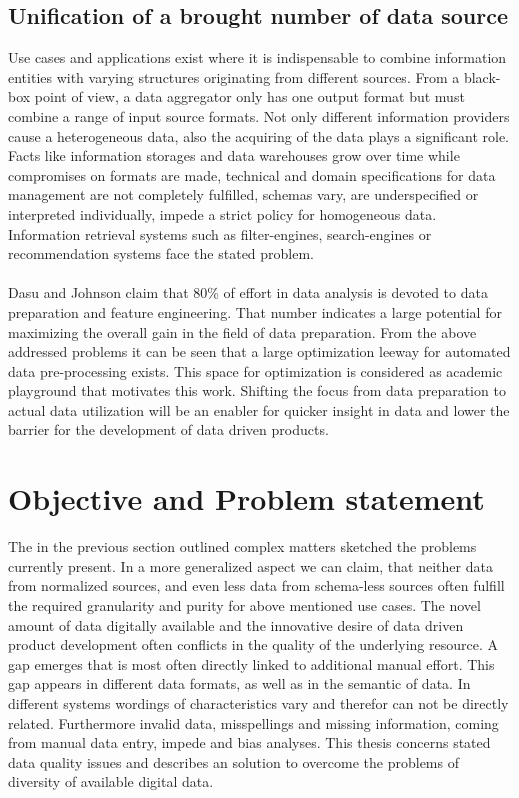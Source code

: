 \subsection{Unification of a brought number of data source} 

Use cases and applications exist where it is indispensable to combine information entities with varying structures originating from different sources. From a black-box point of view, a data aggregator only has one output format but must combine a range of input source formats. Not only different information providers cause a heterogeneous data, also the acquiring of the data plays a significant role. Facts like information storages and data warehouses grow over time while compromises on formats are made, technical and domain specifications for data management are not completely fulfilled, schemas vary, are underspecified or interpreted individually, impede a strict policy for homogeneous data. Information retrieval systems such as filter-engines, search-engines or recommendation systems face the stated problem. 
\\\\
Dasu and Johnson claim that 80\% of effort in data analysis is devoted to data preparation and feature engineering\cite{dasu_johnson_2003}. That number indicates a large potential for maximizing the overall gain in the field of data preparation. From the above addressed problems it can be seen that a large optimization leeway for automated data pre-processing exists. This space for optimization is considered as academic playground that motivates this work. Shifting the focus from data preparation to actual data utilization will be an enabler for quicker insight in data and lower the barrier for the development of data driven products.

\section{Objective and Problem statement\label{sec:objective}}
The in the previous section outlined complex matters sketched the problems currently present. In a more generalized aspect we can claim, that neither data from normalized sources, and even less data from schema-less sources often fulfill the required granularity and purity for above mentioned use cases. The novel amount of data digitally available and the innovative desire of data driven product development often conflicts in the quality of the underlying resource. A gap emerges that is most often directly linked to additional manual effort. This gap appears in different data formats, as well as in the semantic of data. In different systems wordings of characteristics vary and therefor can not be directly related. Furthermore invalid data, misspellings and missing information, coming from manual data entry, impede and bias analyses. This thesis concerns stated data quality issues and describes an solution to overcome the problems of diversity of available digital data.  

